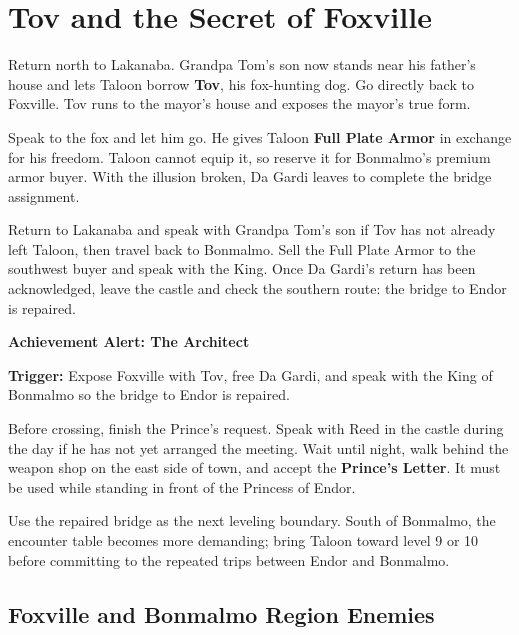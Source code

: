\documentclass[
  american,
  10pt,
  letterpaper,
  oneside,
  open=any]{scrreprt}
\begin{document}
\section{Tov and the Secret of
Foxville}\label{tov-and-the-secret-of-foxville}

Return north to Lakanaba. Grandpa Tom's son now stands near his father's
house and lets Taloon borrow \textbf{Tov}, his fox-hunting dog. Go
directly back to Foxville. Tov runs to the mayor's house and exposes the
mayor's true form.

Speak to the fox and let him go. He gives Taloon \textbf{Full Plate
Armor} in exchange for his freedom. Taloon cannot equip it, so reserve
it for Bonmalmo's premium armor buyer. With the illusion broken, Da
Gardi leaves to complete the bridge assignment.

Return to Lakanaba and speak with Grandpa Tom's son if Tov has not
already left Taloon, then travel back to Bonmalmo. Sell the Full Plate
Armor to the southwest buyer and speak with the King. Once Da Gardi's
return has been acknowledged, leave the castle and check the southern
route: the bridge to Endor is repaired.

\begin{achievementalert}

\textbf{Achievement Alert: The Architect}

\textbf{Trigger:} Expose Foxville with Tov, free Da Gardi, and speak
with the King of Bonmalmo so the bridge to Endor is repaired.

\end{achievementalert}

Before crossing, finish the Prince's request. Speak with Reed in the
castle during the day if he has not yet arranged the meeting. Wait until
night, walk behind the weapon shop on the east side of town, and accept
the \textbf{Prince's Letter}. It must be used while standing in front of
the Princess of Endor.

Use the repaired bridge as the next leveling boundary. South of
Bonmalmo, the encounter table becomes more demanding; bring Taloon
toward level 9 or 10 before committing to the repeated trips between
Endor and Bonmalmo.

\subsection{Foxville and Bonmalmo Region
Enemies}\label{foxville-and-bonmalmo-region-enemies}
\end{document}
